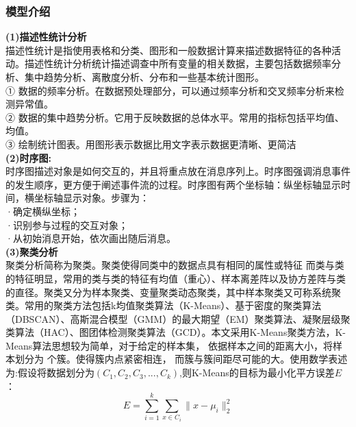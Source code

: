 \documentclass[UTF8]{article}
\begin{document}
     \subsubsection{模型介绍}
     \textbf{(1)描述性统计分析}\\
        描述性统计是指使用表格和分类、图形和一般数据计算来描述数据特征的各种活动。描述性统计分析统计描述调查中所有变量的相关数据，主要包括数据频率分析、集中趋势分析、离散度分析、分布和一些基本统计图形。\\
        ① 数据的频率分析。在数据预处理部分，可以通过频率分析和交叉频率分析来检测异常值。\\
        ② 数据的集中趋势分析。它用于反映数据的总体水平。常用的指标包括平均值、均值。\\
        ③ 绘制统计图表。用图形表示数据比用文字表示数据更清晰、更简洁\\
    \textbf{(2)时序图:}\\
         时序图描述对象是如何交互的，并且将重点放在消息序列上。时序图强调消息事件的发生顺序，更方便于阐述事件流的过程。时序图有两个坐标轴：纵坐标轴显示时间，横坐标轴显示对象。步骤为：\\
        ·确定横纵坐标；\\
        ·识别参与过程的交互对象；\\
        ·从初始消息开始，依次画出随后消息。\\
    \textbf{(3)聚类分析}\\
        聚类分析简称为聚类。聚类使得同类中的数据点具有相同的属性或特征
        而类与类的特征明显，常用的类与类的特征有均值（重心）、样本离差阵以及协方差阵与类的直径。聚类又分为样本聚类、变量聚类动态聚类，其中样本聚类又可称系统聚类。常用的聚类方法包括k均值聚类算法（K-Means）、基于密度的聚类算法（DBSCAN）、高斯混合模型（GMM）的最大期望（EM）聚类算法、凝聚层级聚类算法（HAC）、图团体检测聚类算法（GCD）。本文采用K-Means聚类方法，K-Means算法思想较为简单，对于给定的样本集，
        依据样本之间的距离大小，将样本划分为 个簇。使得簇内点紧密相连，
        而簇与簇间距尽可能的大。使用数学表述为:假设将数据划分为$( C_1,C_2,C_3,...,C_k) $,则K-Means的目标为最小化平方误差$E$：
                \begin{equation}
                    E=\sum_{i=1}^k\sum_{x \in C_i}\| x-\mu_i \|_2^2  
                \end{equation}
                        



     
            

    


    
\end{document}
